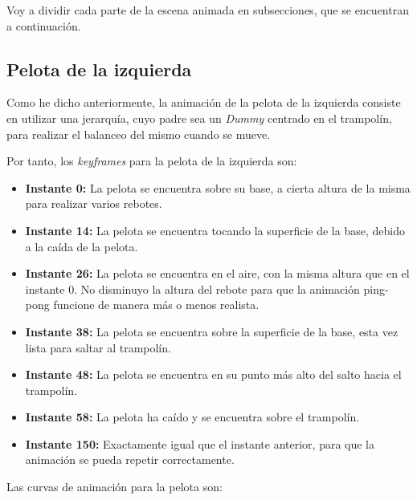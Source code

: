 \bigskip


Voy a dividir cada parte de la escena animada en subsecciones, que se encuentran a continuación.

\subsection{Pelota de la izquierda}
Como he dicho anteriormente, la animación de la pelota de la izquierda consiste en utilizar una jerarquía, cuyo padre sea un \textit{Dummy} centrado en el trampolín, para realizar el balanceo del mismo cuando se mueve.

\bigskip

Por tanto, los \textit{keyframes} para la pelota de la izquierda son:

\begin{itemize}
    \item \textbf{Instante 0: }La pelota se encuentra sobre su base, a cierta altura de la misma para realizar varios rebotes.
    \item \textbf{Instante 14: }La pelota se encuentra tocando la superficie de la base, debido a la caída de la pelota.
    \item \textbf{Instante 26: }La pelota se encuentra en el aire, con la misma altura que en el instante 0. No disminuyo la altura del rebote para que la animación ping-pong funcione de manera más o menos realista.
    \item \textbf{Instante 38: }La pelota se encuentra sobre la superficie de la base, esta vez lista para saltar al trampolín.
    \item \textbf{Instante 48: }La pelota se encuentra en su punto más alto del salto hacia el trampolín.
    \item \textbf{Instante 58: }La pelota ha caído y se encuentra sobre el trampolín.
    \item \textbf{Instante 150: }Exactamente igual que el instante anterior, para que la animación se pueda repetir correctamente.
\end{itemize}

\bigskip

Las curvas de animación para la pelota son:

